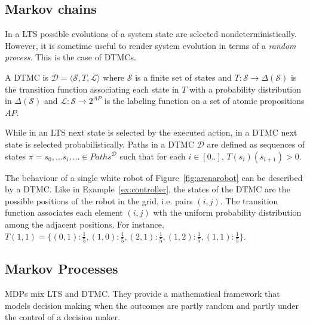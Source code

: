 
\subsection*{Markov chains} %
\label{ssec:markov_chains}

In a \ac{LTS} possible evolutions of a system state are selected nondeterministically. However, it is sometime useful to render system 
evolution in terms of a \emph{random process}. This is the case of \ac{DTMC}s.
\begin{definition}[\ac{DTMC}]
A \ac{DTMC} is $\mathcal{D} = \langle \mathcal{S}, 
T, \mathscr{L} \rangle$
where $\mathcal{S}$ is a finite set of states
and $T: \mathcal{S} \rightarrow \Delta(\mathcal{S})$ is the transition function associating each state in $T$ with
a probability distribution in $\Delta(\mathcal{S})$ and $\mathscr{L}:\mathcal{S} \rightarrow 2^{AP} $ is the labeling function on a set of atomic propositions $AP$.
\end{definition}

While in an \ac{LTS} next state is selected by the executed action, in a DTMC next state is selected probabilistically. 
%
Paths in a \ac{DTMC} $\mathcal{D}$ are defined as sequences of states $\pi = s_0,\dots s_i,\dots \in Paths^{\mathcal{D}}$ such that for each $i \in [0..]$, $T(s_i)(s_{i+1})>0$.

\begin{example}{}\label{ex:dtmc}
The behaviour of a single white robot of Figure~\ref{fig:arenarobot} can be described by a \ac{DTMC}. Like in Example~\ref{ex:controller},
the states of the \ac{DTMC} are the possible positions of the robot in the grid, i.e. pairs $(i,j)$. The transition function associates each element $(i,j)$ wth
the uniform probability distribution among the adjacent positions. For instance, $T(1,1)=\{ (0,1):\frac{1}{5} , (1,0):\frac{1}{5} , (2,1):\frac{1}{5} , (1,2):\frac{1}{5} , (1,1):\frac{1}{5} \}$.
\end{example}
%
\subsection*{Markov Processes} %
\label{ssec:markov_processes}
\ac{MDP}s mix \ac{LTS} and \ac{DTMC}. They provide a mathematical framework that models decision making when the outcomes are partly random and partly under the control of a decision maker.


